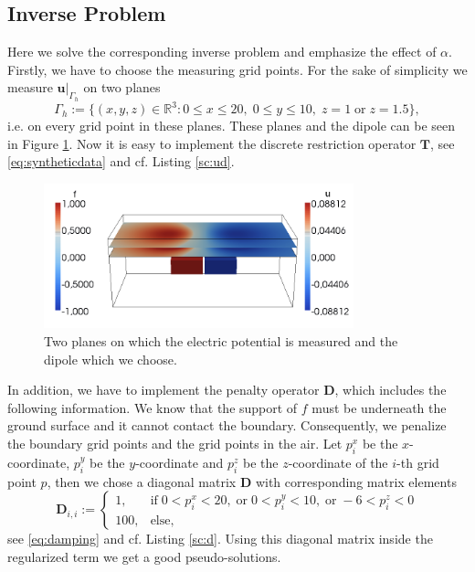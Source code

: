 \documentclass[a4paper, 11pt, twoside]{article}
\begin{document}
\subsection{Inverse Problem}\label{sec:exampleinvpro}
%
Here we solve the corresponding inverse problem and emphasize the effect of $\alpha$. Firstly, we have to choose the measuring grid points. For the sake of simplicity we measure $\boldsymbol{u}|_{\Gamma_h}$ on two planes
%
\begin{equation*}
	\Gamma_h:=\{(x,y,z)\in\mathbb{R}^3:0\le x\le 20,\;0\le y\le 10,\;z=1\;\text{or}\;z=1.5\},
\end{equation*}
%
i.e. on every grid point in these planes. These planes and the dipole can be seen in Figure \ref{planes_dipole}. Now it is easy to implement the discrete restriction operator $\boldsymbol{T}$, see \eqref{eq:syntheticdata} and cf. Listing \ref{sc:ud}.\\

\begin{figure}[h!]
	\centering
		\includegraphics[width=0.8\textwidth]{fig/f_direct_and_measure_points.png}
\caption{Two planes on which the electric potential is measured and the dipole which we choose.}
\label{planes_dipole}
\end{figure}

In addition, we have to implement the penalty operator $\boldsymbol{D}$, which includes the following information. We know that the support of $f$ must be underneath the ground surface and it cannot contact the boundary. Consequently, we penalize the boundary grid points and the grid points in the air. Let $p^x_i$ be the $x$-coordinate, $p^y_i$ be the $y$-coordinate and $p^z_i$ be the $z$-coordinate of the $i$-th grid point $p$, then we chose a diagonal matrix $\boldsymbol{D}$ with corresponding matrix elements
%
\begin{equation*}
	\boldsymbol{D}_{i,i}:=\left\{\begin{array}{ll}
	1, & \text{if}\;0<p^x_i<20,\;\text{or}\;0<p^y_i<10,\;\text{or}\;-6<p^z_i<0\\
	100, & \text{else},
	\end{array}\right.
\end{equation*}
%
see \eqref{eq:damping} and cf. Listing \ref{sc:d}. Using this diagonal matrix inside the regularized term we get a good pseudo-solutions.\\
\end{document}

